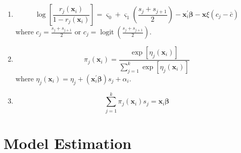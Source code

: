 \begin{enumerate}
    \item \begin{equation}
              \log\left[\frac{r_{j}\left(\mathbf{x}_{i}\right)}{1-r_{j}\left(\mathbf{x}_{i}\right)}\right]=\varsigma_{0}+\varsigma_{1}\left(\frac{s_{j}+s_{j+1}}{2}\right)-\mathbf{x}_{i}^{\prime}\boldsymbol{\beta}-\mathbf{x}\xi\left(c_{j}-\bar{c}\right)
          \end{equation}
          where $c_{j}=\frac{s_{j}+s_{j+1}}{2}$ or $c_{j}=\operatorname{logit}\left(\frac{s_{j}+s_{j+1}}{2}\right)$.
    \item \begin{equation}
              \pi_{j}\left(\mathbf{x}_{i}\right)=\frac{\exp \left[\eta_{j}\left(\mathbf{x}_{i}\right)\right]}{\sum_{j=1}^{k} \exp \left[\eta_{j}\left(\mathbf{x}_{i}\right)\right]}
          \end{equation}
          where $\eta_{j}\left(\mathbf{x}_{i}\right)=\eta_{j}+\left(\mathbf{x}_{i}^{\prime}\boldsymbol{\beta}\right)s_{j}+\alpha_{i}$.
    \item \begin{equation}
              \sum_{j=1}^{k}\pi_{j}\left(\mathbf{x}_{i}\right)s_{j}=\mathbf{x}_{i}\boldsymbol{\beta}
          \end{equation}
\end{enumerate}

\section{Model Estimation}